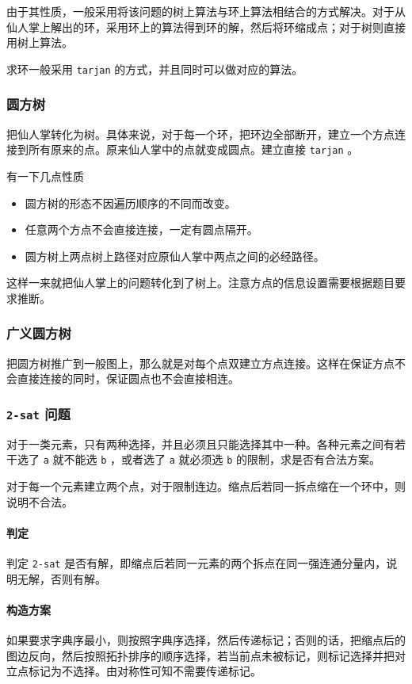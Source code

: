 \documentclass[UTF-8]{ctexart}
\begin{document}
	由于其性质，一般采用将该问题的树上算法与环上算法相结合的方式解决。对于从仙人掌上解出的环，采用环上的算法得到环的解，然后将环缩成点；对于树则直接用树上算法。
	
	求环一般采用 \texttt{tarjan} 的方式，并且同时可以做对应的算法。
	
	\subsubsection{圆方树}
	把仙人掌转化为树。具体来说，对于每一个环，把环边全部断开，建立一个方点连接到所有原来的点。原来仙人掌中的点就变成圆点。建立直接 \texttt{tarjan} 。
	
	有一下几点性质
	
	\begin{itemize}
		\item 圆方树的形态不因遍历顺序的不同而改变。
		\item 任意两个方点不会直接连接，一定有圆点隔开。
		\item 圆方树上两点树上路径对应原仙人掌中两点之间的必经路径。
	\end{itemize}
	
	这样一来就把仙人掌上的问题转化到了树上。注意方点的信息设置需要根据题目要求推断。
	
	\subsubsection{广义圆方树}
	把圆方树推广到一般图上，那么就是对每个点双建立方点连接。这样在保证方点不会直接连接的同时，保证圆点也不会直接相连。
	
	\subsubsection{\texttt{2-sat} 问题}
	对于一类元素，只有两种选择，并且必须且只能选择其中一种。各种元素之间有若干选了 \texttt{a} 就不能选 \texttt{b} ，或者选了 \texttt{a} 就必须选 \texttt{b} 的限制，求是否有合法方案。
	
	对于每一个元素建立两个点，对于限制连边。缩点后若同一拆点缩在一个环中，则说明不合法。
	
	\paragraph{判定}判定 \texttt{2-sat} 是否有解，即缩点后若同一元素的两个拆点在同一强连通分量内，说明无解，否则有解。
	
	\paragraph{构造方案} 如果要求字典序最小，则按照字典序选择，然后传递标记；否则的话，把缩点后的图边反向，然后按照拓扑排序的顺序选择，若当前点未被标记，则标记选择并把对立点标记为不选择。由对称性可知不需要传递标记。
	
\end{document}
